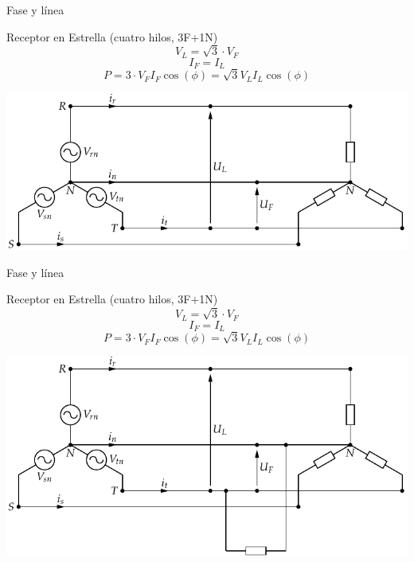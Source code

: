 \documentclass[xcolor={usenames,svgnames,dvipsnames}]{beamer}
\begin{document}
\begin{frame}[label={sec:orge3ce18f}]{Fase y línea}
\begin{block}{Receptor en Estrella (cuatro hilos, 3F+1N)}
$$V_{L}=\sqrt{3}\cdot V_{F}$$ $$I_{F}=I_{L}$$
$$P=3\cdot V_{F}I_{F}\cos(\phi)=\sqrt{3}V_{L}I_{L}\cos(\phi)$$
\begin{center}
\includegraphics[width=.9\linewidth]{../figs/RedTrifasicaEstrella.pdf}
\end{center}
\end{block}
\end{frame}

\begin{frame}[label={sec:org3c89a1e}]{Fase y línea}
\begin{block}{Receptor en Estrella (cuatro hilos, 3F+1N)}
$$V_{L}=\sqrt{3}\cdot V_{F}$$ $$I_{F}=I_{L}$$
$$P=3\cdot V_{F}I_{F}\cos(\phi)=\sqrt{3}V_{L}I_{L}\cos(\phi)$$
\begin{center}
\includegraphics[width=.9\linewidth]{../figs/RedTrifasicaEstrella_CargaMonofasica.pdf}
\end{center}
\end{block}
\end{frame}
\end{document}
